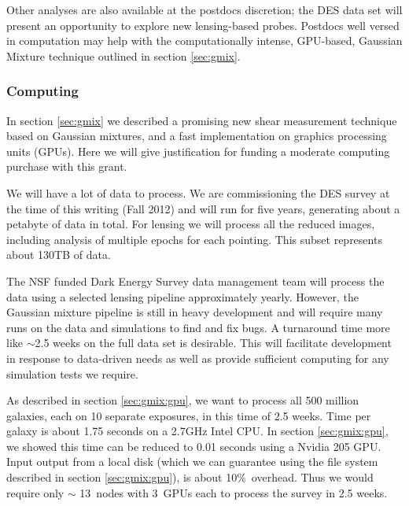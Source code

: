 \documentclass[12pt]{article}
\newcommand{\commissdate}{Fall 2012}
\newcommand{\iooverhead}{10\%}
\newcommand{\nmachines}{13}
\newcommand{\ngpus}{3}
\begin{document}
Other analyses are also available at the postdocs discretion; the DES data set
will present an opportunity to explore new lensing-based probes.  Postdocs well
versed in computation may help with the computationally intense, GPU-based,
Gaussian Mixture technique outlined in section \ref{sec:gmix}.

\subsubsection{Computing} \label{sec:computing}

In section \ref{sec:gmix} we described a promising new shear measurement
technique based on Gaussian mixtures, and a fast implementation on graphics
processing units (GPUs).  Here we will give justification for funding a
moderate computing purchase with this grant.

We will have a lot of data to process.  We are commissioning the DES survey at
the time of this writing (\commissdate) and will run for five years, generating
about a petabyte of data in total.  For lensing we will process all the reduced
images, including analysis of multiple epochs for each pointing.  This subset
represents about 130TB of data.

The NSF funded Dark Energy Survey data management team will process the data
using a selected lensing pipeline approximately yearly.  However, the Gaussian
mixture pipeline is still in heavy development and will require many runs on
the data and simulations to find and fix bugs.  A turnaround time more like
$\sim$2.5 weeks on the full data set is desirable.   This will facilitate
development in response to data-driven needs as well as provide sufficient
computing for any simulation tests we require.


As described in section \ref{sec:gmix:gpu}, we want to process all 500 million
galaxies, each on 10 separate exposures, in this time of 2.5 weeks. Time per
galaxy is about 1.75 seconds on a 2.7GHz Intel CPU. In section
\ref{sec:gmix:gpu}, we showed this time can be reduced to 0.01 seconds using a
Nvidia 205 GPU.  Input output from a local disk (which we can guarantee using
the file system described in section \ref{sec:gmix:gpu}), is about \iooverhead\
overhead.  Thus we would require only $\sim$ \nmachines\ nodes with \ngpus\
GPUs each to process the survey in 2.5 weeks. 
\end{document}
